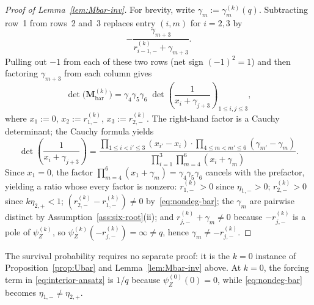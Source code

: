 \documentclass[11pt]{article}
\theoremstyle{plain}
\theoremstyle{definition}
\theoremstyle{remark}
\begin{document}
\begin{proof}[Proof of Lemma~\ref{lem:Mbar-inv}]\label{proof:lem:Mbar-inv}
For brevity, write $\gamma_m:=\gamma_m^{(k)}(q)$.  Subtracting row~1 from rows~2 and~3
replaces entry $(i,m)$ for $i=2,3$ by
\[
-\frac{\gamma_{m+3}}{r_{i-1,-}^{(k)}+\gamma_{m+3}}.
\]
Pulling out $-1$ from each of these two rows (net sign $(-1)^2=1$) and then factoring
$\gamma_{m+3}$ from each column gives
\[
\det\!\bigl(\mathbf{M}_{\mathrm{bar}}^{(k)}\bigr)
=
\gamma_4\gamma_5\gamma_6\;
\det\!\left(\frac{1}{x_i+\gamma_{j+3}}\right)_{\!1\le i,j\le 3},
\]
where $x_1:=0$, $x_2:=r_{1,-}^{(k)}$, $x_3:=r_{2,-}^{(k)}$.
The right-hand factor is a Cauchy determinant; the Cauchy formula yields
\[
\det\!\left(\frac{1}{x_i+\gamma_{j+3}}\right)
=
\frac{\prod_{1\le i<i'\le 3}(x_{i'}-x_i)\cdot
      \prod_{4\le m<m'\le 6}(\gamma_{m'}-\gamma_m)}
     {\prod_{i=1}^3\prod_{m=4}^6(x_i+\gamma_m)}.
\]
Since $x_1=0$, the factor $\prod_{m=4}^6(x_1+\gamma_m)=\gamma_4\gamma_5\gamma_6$
cancels with the prefactor, yielding a ratio whose every factor is nonzero:
$r_{1,-}^{(k)}>0$ since $\eta_{1,-}>0$;
$r_{2,-}^{(k)}>0$ since $k\eta_{2,+}<1$;
$(r_{2,-}^{(k)}-r_{1,-}^{(k)})\neq 0$ by~\eqref{eq:nondeg-bar};
the $\gamma_m$ are pairwise distinct by Assumption~\ref{ass:six-root}(ii);
and $r_{j,-}^{(k)}+\gamma_m\neq 0$ because $-r_{j,-}^{(k)}$ is a pole of $\psi_Z^{(k)}$,
so $\psi_Z^{(k)}(-r_{j,-}^{(k)})=\infty\neq q$, hence $\gamma_m\neq -r_{j,-}^{(k)}$.
\end{proof}

The survival probability requires no separate proof: it is the $k=0$ instance of
Proposition~\ref{prop:Ubar} and Lemma~\ref{lem:Mbar-inv} above. At $k=0$, the forcing term
in \eqref{eq:interior-ansatz} is $1/q$ because $\psi_Z^{(0)}(0)=0$, while
\eqref{eq:nondeg-bar} becomes $\eta_{1,-}\neq\eta_{2,+}$.
\end{document}
